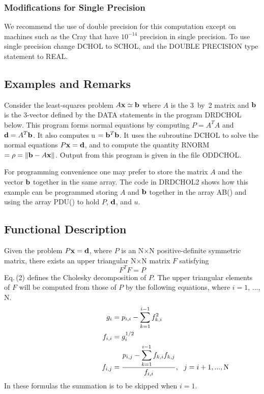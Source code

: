 \documentclass[twoside]{MATH77}
\begin{document}
\subsubsection{Modifications for Single Precision}

We recommend the use of double precision for this computation except on
machines such as the Cray that have $10^{-14}$ precision in single
precision. To use single precision change DCHOL to SCHOL, and the DOUBLE
PRECISION type statement to REAL.

\subsection{Examples and Remarks}

Consider the least-squares problem $A{\bf x}\simeq {\bf b}$ where $A$ is the
3~by~2 matrix and ${\bf b}$ is the 3-vector defined by the DATA statements
in the program DRDCHOL below. This program forms normal equations by
computing $P=A^TA$ and ${\bf d}=A^T{\bf b}$. It also computes u $={\bf b}^T%
{\bf b}$. It uses the subroutine DCHOL to solve the normal equations $P{\bf x%
}={\bf d}$, and to compute the quantity RNORM $=\rho =\Vert {\bf b}-A{\bf x}%
\Vert $. Output from this program is given in the file ODDCHOL.

For programming convenience one may prefer to store the matrix $A$ and the
vector ${\bf b}$ together in the same array. The code in DRDCHOL2 shows how
this example can be programmed storing $A$ and ${\bf b}$ together in the
array AB() and using the array PDU() to hold $P$, ${\bf d}$, and $u.$

\subsection{Functional Description}

Given the problem $P{\bf x}={\bf d}$, where $P$ is an N$\times $N
positive-definite symmetric matrix, there exists an upper triangular
N$\times $N matrix $F$ satisfying
\begin{equation}
\label{O2}F^TF=P
\end{equation}
Eq.\,(2) defines the Cholesky decomposition of $P$. The upper triangular
elements of $F$ will be computed from those of $P$ by the following
equations, where $i=1$, ..., N.
\begin{align}
\label{O3}g_i&=p_{i,i}-\sum_{k=1}^{i-1}f_{k,i}^2\\
\label{O4}f_{i,i}&=g_{i}^{1/2}\\
\label{O5}f_{i,j}&=\frac{\displaystyle p_{i,j}-\sum_{k=1}^{i-1}f_{k,i}f_{k,j}%
}{f_{i,i}},\ \ j=i+1,...,\text{N}\hspace{-2in}
\end{align}
In these formulas the summation is to be skipped when $i=1.$
\end{document}
